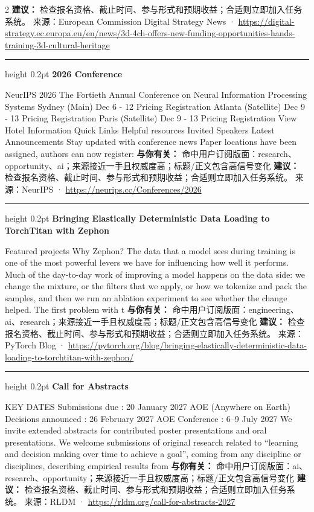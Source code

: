 \documentclass[10.5pt]{ctexart}
\begin{document}
\begin{multicols}{2}
\textbf{建议：} 检查报名资格、截止时间、参与形式和预期收益；合适则立即加入任务系统。
{\footnotesize\color{ormuted} 来源：European Commission Digital Strategy News · \url{https://digital-strategy.ec.europa.eu/en/news/3d-4ch-offers-new-funding-opportunities-hands-training-3d-cultural-heritage}}
\vspace{2mm}
\hrule height 0.2pt
\vspace{2mm}
{\large\bfseries 2026 Conference}\par
NeurIPS 2026 The Fortieth Annual Conference on Neural Information Processing Systems Sydney (Main) Dec 6 - 12 Pricing Registration Atlanta (Satellite) Dec 9 - 13 Pricing Registration Paris (Satellite) Dec 9 - 13 Pricing Registration View Hotel Information Quick Links Helpful resources Invited Speakers Latest Announcements Stay updated with conference news Paper locations have been assigned, authors can now register: 
\textbf{与你有关：} 命中用户订阅版面：research、opportunity、ai；来源接近一手且权威度高；标题/正文包含高信号变化
\textbf{建议：} 检查报名资格、截止时间、参与形式和预期收益；合适则立即加入任务系统。
{\footnotesize\color{ormuted} 来源：NeurIPS · \url{https://neurips.cc/Conferences/2026}}
\vspace{2mm}
\hrule height 0.2pt
\vspace{2mm}
{\large\bfseries Bringing Elastically Deterministic Data Loading to TorchTitan with Zephon}\par
Featured projects Why Zephon? The data that a model sees during training is one of the most powerful levers we have for influencing how well it performs. Much of the day-to-day work of improving a model happens on the data side: we change the mixture, or the filters that we apply, or how we tokenize and pack the samples, and then we run an ablation experiment to see whether the change helped. The first problem with t
\textbf{与你有关：} 命中用户订阅版面：engineering、ai、research；来源接近一手且权威度高；标题/正文包含高信号变化
\textbf{建议：} 检查报名资格、截止时间、参与形式和预期收益；合适则立即加入任务系统。
{\footnotesize\color{ormuted} 来源：PyTorch Blog · \url{https://pytorch.org/blog/bringing-elastically-deterministic-data-loading-to-torchtitan-with-zephon/}}
\vspace{2mm}
\hrule height 0.2pt
\vspace{2mm}
{\large\bfseries Call for Abstracts}\par
KEY DATES Submissions due : 20 January 2027 AOE (Anywhere on Earth) Decisions announced : 26 February 2027 AOE Conference : 6–9 July 2027 We invite extended abstracts for contributed poster presentations and oral presentations. We welcome submissions of original research related to “learning and decision making over time to achieve a goal”, coming from any discipline or disciplines, describing empirical results from 
\textbf{与你有关：} 命中用户订阅版面：ai、research、opportunity；来源接近一手且权威度高；标题/正文包含高信号变化
\textbf{建议：} 检查报名资格、截止时间、参与形式和预期收益；合适则立即加入任务系统。
{\footnotesize\color{ormuted} 来源：RLDM · \url{https://rldm.org/call-for-abstracts-2027}}
\end{multicols}
\end{document}
